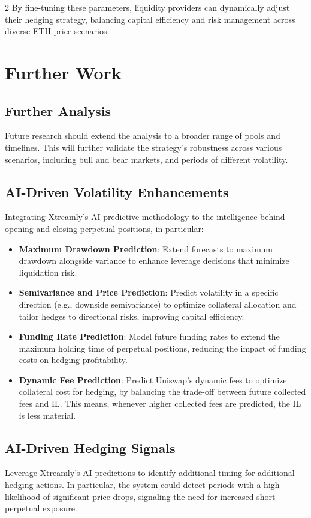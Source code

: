 \documentclass[10pt]{article}
\begin{document}
\begin{multicols}{2}
By fine-tuning these parameters, liquidity providers can dynamically adjust their hedging strategy, balancing capital efficiency and risk management across diverse ETH price scenarios.

\newpage

\section{Further Work}
\label{sec:futurework}

\subsection{Further Analysis}
Future research should extend the analysis to a broader range of pools and timelines. This will further validate the strategy’s robustness across various scenarios, including bull and bear markets, and periods of different volatility.

\subsection{AI-Driven Volatility Enhancements}
Integrating Xtreamly’s AI predictive methodology to the intelligence behind opening and closing perpetual positions, in particular:
\begin{itemize}
	\item \textbf{Maximum Drawdown Prediction}: Extend forecasts to maximum drawdown alongside variance to enhance leverage decisions that minimize liquidation risk. 
	\item \textbf{Semivariance and Price Prediction}: Predict volatility in a specific direction (e.g., downside semivariance) to optimize collateral allocation and tailor hedges to directional risks, improving capital efficiency.
	\item \textbf{Funding Rate Prediction}: Model future funding rates to extend the maximum holding time of perpetual positions, reducing the impact of funding costs on hedging profitability.
	\item \textbf{Dynamic Fee Prediction}: Predict Uniswap’s dynamic fees to optimize collateral cost for hedging, by balancing the trade-off between future collected fees and IL. This means, whenever higher collected fees are predicted, the IL is less material. 
\end{itemize}

\subsection{AI-Driven Hedging Signals}
Leverage Xtreamly’s AI predictions to identify additional timing for additional hedging actions. In particular, the system could detect periods with a high likelihood of significant price drops, signaling the need for increased short perpetual exposure.


\end{multicols}
\end{document}
